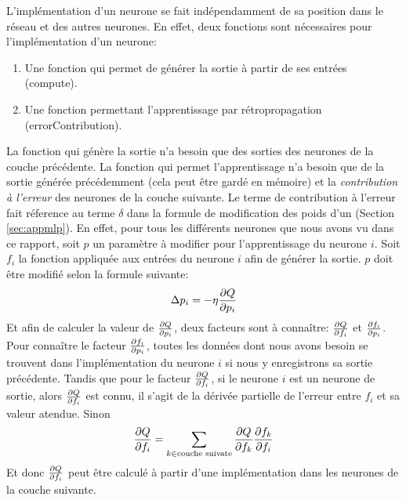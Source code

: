 \documentclass[12pt,a4paper,oneside, titlepage]{article}
\begin{document}
L'implémentation d'un neurone se fait indépendamment de sa position dans le réseau et des autres neurones.
En effet, deux fonctions sont nécessaires pour l'implémentation d'un neurone:
\begin{enumerate}
 \item Une fonction qui permet de générer la sortie à partir de ses entrées (compute).
 \item Une fonction permettant l'apprentissage par rétropropagation (errorContribution).
\end{enumerate}
La fonction qui génère la sortie n'a besoin que des sorties des neurones de la couche précédente.
La fonction qui permet l'apprentissage n'a besoin que de la sortie générée précédemment (cela peut être gardé en mémoire) et la \emph{contribution à l'erreur} des neurones de la couche suivante.
Le terme de contribution à l'erreur fait réference au terme $\delta$ dans la formule de modification des poids d'un \mlp (Section \ref{sec:appmlp}).
En effet, pour tous les différents neurones que nous avons vu dans ce rapport, soit $p$ un paramètre à modifier pour l'apprentissage du neurone $i$.
Soit $f_i$ la fonction appliquée aux entrées du neurone $i$ afin de générer la sortie.
$p$ doit être modifié selon la formule suivante:
\[\Delta p_i = -\eta \frac{\partial Q}{\partial p_i}\]
Et afin de calculer la valeur de $\frac{\partial Q}{\partial p_i}$, deux facteurs sont à connaître: $\frac{\partial Q}{\partial f_i}$ et $\frac{\partial f_i}{\partial p_i}$.
Pour connaître le facteur $\frac{\partial f_i}{\partial p_i}$, toutes les données dont nous avons besoin se trouvent dans l'implémentation du neurone $i$ si nous y enregistrons sa sortie précédente.
Tandis que pour le facteur $\frac{\partial Q}{\partial f_i}$,
si le neurone $i$ est un neurone de sortie, alors $\frac{\partial Q}{\partial f_i}$ est connu, il s'agit de la dérivée partielle de l'erreur entre $f_i$ et sa valeur atendue.
Sinon $$\frac{\partial Q}{\partial f_i} = \sum_{k \in \text{couche suivate}}\frac{\partial Q}{\partial f_k}\frac{\partial f_k}{\partial f_i}$$
Et donc $\frac{\partial Q}{\partial f_i}$ peut être calculé à partir d'une implémentation dans les neurones de la couche suivante.
\end{document}
